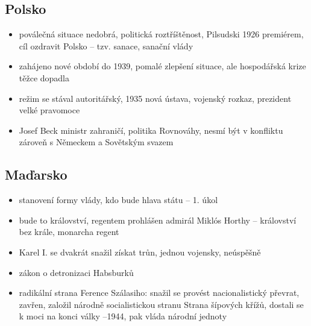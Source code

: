 \documentclass{article}
\begin{document}
\subsection*{Polsko}
\begin{itemize}
    \item poválečná situace nedobrá, politická roztříštěnost, Pilsudski 1926 premiérem, cíl ozdravit Polsko -- tzv. sanace, sanační vlády
    \item zahájeno nové období do 1939, pomalé zlepšení situace, ale hospodářská krize těžce dopadla
    \item režim se stával autoritářský, 1935 nová ústava, vojenský rozkaz, prezident velké pravomoce
    \item Josef Beck ministr zahraničí, politika Rovnováhy, nesmí být v konfliktu zároveň s Německem a Sovětským svazem
\end{itemize}

\subsection*{Maďarsko}
\begin{itemize}
    \item stanovení formy vlády, kdo bude hlava státu -- 1. úkol
    \item bude to království, regentem prohlášen admirál Miklós Horthy -- království bez krále, monarcha regent
    \item Karel I. se dvakrát snažil získat trůn, jednou vojensky, neúspěšně
    \item zákon o detronizaci Habsburků
    \item radikální strana Ference Szálasiho: snažil se provést nacionalistický převrat, zavřen, založil národně socialistickou stranu Strana šípových křížů, dostali se k moci na konci války --1944, pak vláda národní jednoty
\end{itemize}
\end{document}

